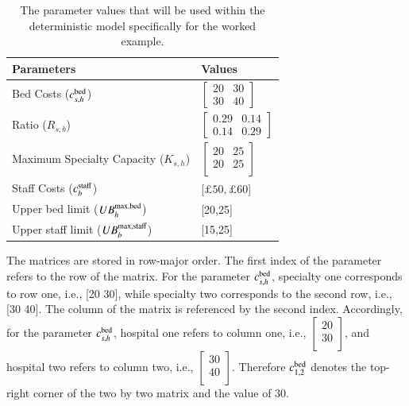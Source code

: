 \documentclass[../thesis.tex]{subfiles}
\begin{document}
\begin{table}[h!]
    \centering
    \begin{tabular}{ll}\toprule
       \textbf{Parameters}  & \textbf{Values} \\\midrule
        Bed Costs ($c^\textnormal{bed}_{s,h}$) & $\begin{bmatrix} 20 & 30 \\ 30 & 40 \end{bmatrix}$\\ [0.5cm]
        Ratio ($R_{s,b}$) &$\begin{bmatrix}0.29&0.14\\ 
         0.14&0.29\end{bmatrix}$\\ [0.5cm]
         Maximum Specialty Capacity ($K_{s,h}$) &$\begin{bmatrix}
         20&25 \\
         20&25\\
         \end{bmatrix}$\\ [0.5cm]
         Staff Costs ($c^\textnormal{staff}_{b}$) &[$\pounds50, \pounds60$] \\ [0.25cm]
        Upper bed limit ($UB^\textnormal{max,bed}_{h}$) &  [20,25]\\[0.25cm]
         Upper staff limit ($UB^\textnormal{max,staff}_{b}$)& [15,25]\\\bottomrule
    \end{tabular}
    \caption{The parameter values that will be used within the deterministic model specifically for the worked example.}
    \label{tab:DeterministicWorkedExample}
\end{table}
The matrices are stored in row-major order. The first index of the parameter refers to the row of the matrix.  For the parameter $c^{\textnormal{bed}}_{s,h}$, specialty one corresponds to row one, i.e., [20 30], while specialty two corresponds to the second row, i.e., [30  40]. The column of the matrix is referenced by the second index. Accordingly, for the parameter $c^{\textnormal{bed}}_{s,h}$, hospital one refers to column one, i.e., \scriptsize{$\begin{bmatrix} 20 \\30\\\end{bmatrix}$}\normalsize, and hospital two refers to column two, i.e., \scriptsize{$\begin{bmatrix} 30 \\40\\\end{bmatrix}$}\normalsize. Therefore $c^{\textnormal{bed}}_{1,2}$ denotes the top-right corner of the two by two matrix and the value of 30.
\end{document}
